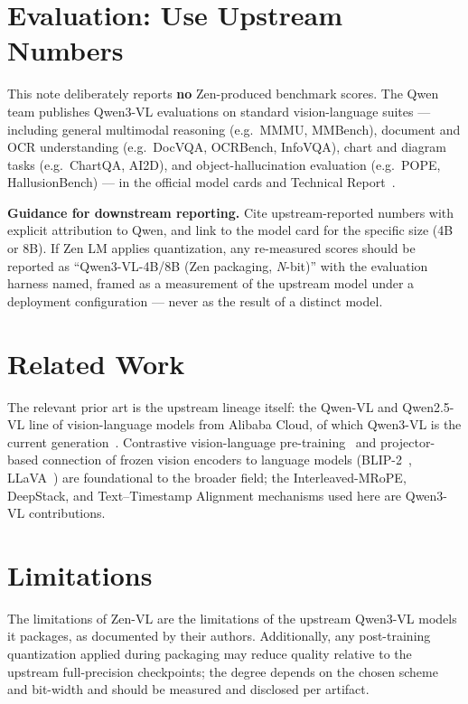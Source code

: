 \documentclass[11pt,a4paper]{article}
\begin{document}
\section{Evaluation: Use Upstream Numbers}

This note deliberately reports \textbf{no} Zen-produced benchmark scores. The Qwen team
publishes Qwen3-VL evaluations on standard vision-language suites --- including general
multimodal reasoning (e.g.\ MMMU, MMBench), document and OCR understanding (e.g.\ DocVQA,
OCRBench, InfoVQA), chart and diagram tasks (e.g.\ ChartQA, AI2D), and object-hallucination
evaluation (e.g.\ POPE, HallusionBench) --- in the official model cards and Technical
Report~\cite{qwen3vl4b,qwen3vlreport}.

\textbf{Guidance for downstream reporting.} Cite upstream-reported numbers with explicit
attribution to Qwen, and link to the model card for the specific size (4B or 8B). If Zen LM
applies quantization, any re-measured scores should be reported as ``Qwen3-VL-4B/8B (Zen
packaging, \textit{N}-bit)'' with the evaluation harness named, framed as a measurement of
the upstream model under a deployment configuration --- never as the result of a distinct
model.

\section{Related Work}

The relevant prior art is the upstream lineage itself: the Qwen-VL and Qwen2.5-VL line of
vision-language models from Alibaba Cloud, of which Qwen3-VL is the current
generation~\cite{qwen3vl4b,qwen3vlreport}. Contrastive vision-language
pre-training~\cite{radford2021clip} and projector-based connection of frozen vision encoders
to language models (BLIP-2~\cite{li2023blip2}, LLaVA~\cite{liu2023llava}) are foundational to
the broader field; the Interleaved-MRoPE, DeepStack, and Text--Timestamp Alignment
mechanisms used here are Qwen3-VL contributions.

\section{Limitations}

The limitations of Zen-VL are the limitations of the upstream Qwen3-VL models it packages,
as documented by their authors. Additionally, any post-training quantization applied during
packaging may reduce quality relative to the upstream full-precision checkpoints; the degree
depends on the chosen scheme and bit-width and should be measured and disclosed per artifact.
\end{document}

